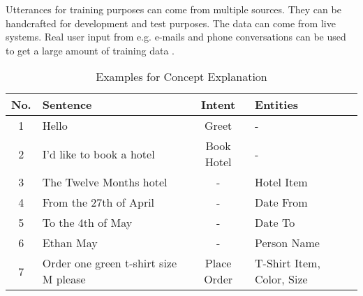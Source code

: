 Utterances for training purposes can come from multiple sources.
They can be handcrafted for development and test purposes.
The data can come from live systems.
Real user input from e.g. e-mails and phone conversations can be used to get a large amount of training data \cite{singhbuilding}.    


\begin{table}[H]
    \centering
    \begin{tabular}{ c | l | c | l }
        No. & Sentence & Intent & Entities \\ \hline \hline
        1 & Hello & Greet & - \\ \hline
        2 & I'd like to book a hotel & Book Hotel & - \\ \hline
        3 & The Twelve Months hotel & - & Hotel Item\\ \hline
        4 & From the 27th of April & - & Date From\\ \hline
        5 & To the 4th of May & - & Date To\\ \hline
        6 & Ethan May & - & Person Name\\ \hline
        7 & Order one green t-shirt size M please & Place Order & T-Shirt Item, Color, Size \\ \hline
    \end{tabular}
    \caption{Examples for Concept Explanation} \label{tab:example_sentences}
\end{table} \noindent


